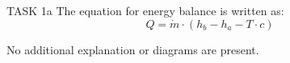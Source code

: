 TASK 1a  
The equation for energy balance is written as:  
\[
Q = \dot{m} \cdot (h_b - h_a - T \cdot c)
\]  

No additional explanation or diagrams are present.